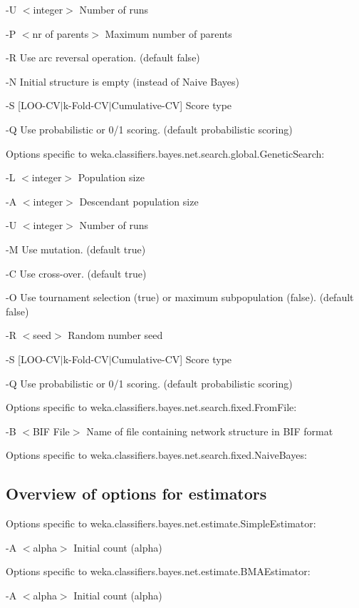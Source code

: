 \documentclass{article}
\begin{document}
-U $<$integer$>$
	Number of runs

-P $<$nr of parents$>$
	Maximum number of parents

-R
	Use arc reversal operation.
	(default false)

-N
	Initial structure is empty (instead of Naive Bayes)

-S [LOO-CV$|$k-Fold-CV$|$Cumulative-CV]
	Score type 

-Q
	Use probabilistic or 0/1 scoring.
	(default probabilistic scoring)

\noindent 
Options specific to weka.classifiers.bayes.net.search.global.GeneticSearch:

-L $<$integer$>$
	Population size

-A $<$integer$>$
	Descendant population size

-U $<$integer$>$
	Number of runs

-M
	Use mutation.
	(default true)

-C
	Use cross-over.
	(default true)

-O
	Use tournament selection (true) or maximum subpopulation (false).
	(default false)

-R $<$seed$>$
	Random number seed

-S [LOO-CV$|$k-Fold-CV$|$Cumulative-CV]
	Score type 

-Q
	Use probabilistic or 0/1 scoring.
	(default probabilistic scoring)

\noindent 
Options specific to weka.classifiers.bayes.net.search.fixed.FromFile:

-B $<$BIF File$>$
	Name of file containing network structure in BIF format


\noindent 
Options specific to weka.classifiers.bayes.net.search.fixed.NaiveBayes:



\subsection*{Overview of options for estimators}


\noindent 
Options specific to weka.classifiers.bayes.net.estimate.SimpleEstimator:

-A $<$alpha$>$
	Initial count (alpha)


\noindent 
Options specific to weka.classifiers.bayes.net.estimate.BMAEstimator:

-A $<$alpha$>$
	Initial count (alpha)
\end{document}
